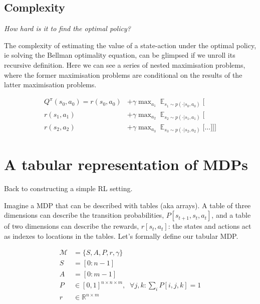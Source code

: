 \subsection{Complexity}

\begin{displayquote}
  \textit{How hard is it to find the optimal policy?}
\end{displayquote}

The complexity of estimating the value of a state-action under the optimal policy, ie solving the Bellman optimality
equation, can be glimpsed if we unroll its recursive definition.
Here we can see a series of nested maximisation problems, where the former
maximisation problems are conditional on the results of the latter maximisation problems.

\begin{align*}
Q^{\pi}(s_0, a_0) = r(s_0, a_0) &+ \gamma \mathop{\text{max}}_{a_1} \mathop{\mathbb E}_{s_1\sim p(\cdot | s_0, a_0)} \Bigg[ \\
r(s_1, a_1)  &+ \gamma \mathop{\text{max}}_{a_2} \mathop{\mathbb E}_{s_2\sim p(\cdot | s_1, a_1)} \bigg[\\
r(s_2, a_2)  &+ \gamma \mathop{\text{max}}_{a_3} \mathop{\mathbb E}_{s_3\sim p(\cdot | s_2, a_2)} \Big[
\dots \Big] \bigg] \Bigg]
\end{align*}

\section{A tabular representation of MDPs}

Back to constructing a simple RL setting.

Imagine a MDP that can be described with tables (aka arrays). A table of
three dimensions can describe the transition probabilities, $P[s_{t+1}, s_t, a_t]$,
and a table of two dimensions can describe the rewards, $r[s_t, a_t]$: the
states and actions act as indexes to locations in the tables.
Let's formally define our tabular MDP.

\begin{align}
\mathcal M &= \{S, A, P, r, \gamma\}\; \tag{the MDP}\\
S &= [0:n-1] \tag{the state space}\\
A &= [0:m-1] \tag{the action space}\\
P &\in [0,1]^{n\times n \times m}, \;\;\forall j, k : \sum_i P[i, j, k] = 1 \tag{the transition fn}\\
r &\in \mathbb R^{n\times m} \tag{the reward fn}
\end{align}

